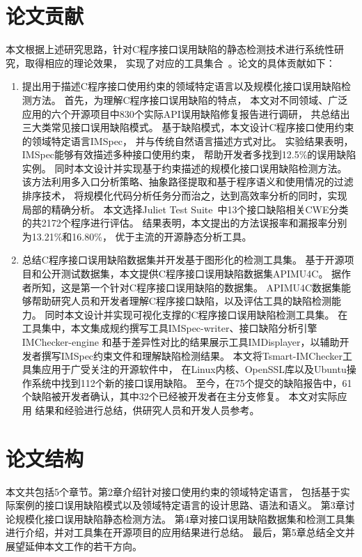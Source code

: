 \section{论文贡献}
本文根据上述研究思路，针对C程序接口误用缺陷的静态检测技术进行系统性研究，取得相应的理论效果，
实现了对应的工具集合~\cite{19-icse-imchecker, 19-tase-imspec, 19-compsac-empirical}。论文的具体贡献如下：

\begin{enumerate}
	\item 提出用于描述C程序接口使用约束的领域特定语言以及规模化接口误用缺陷检测方法。
	首先，为理解C程序接口误用缺陷的特点，
	本文对不同领域、广泛应用的六个开源项目中830个实际API误用缺陷修复报告进行调研，
	共总结出三大类常见接口误用缺陷模式。
	基于缺陷模式，本文设计C程序接口使用约束的领域特定语言IMSpec，
	并与传统自然语言描述方式对比。
	实验结果表明，IMSpec能够有效描述多种接口使用约束，
	帮助开发者多找到12.5\%的误用缺陷实例。
	同时本文设计并实现基于约束描述的规模化接口误用缺陷检测方法。
	该方法利用多入口分析策略、抽象路径提取和基于程序语义和使用情况的过滤排序技术，
	将规模化代码分析任务分而治之，达到高效率分析的同时，实现局部的精确分析。
	本文选择Juliet Test Suite~\cite{juliet}中13个接口缺陷相关CWE分类的共2172个程序进行评估。
	结果表明，本文提出的方法误报率和漏报率分别为13.21\%和16.80\%，
	优于主流的开源静态分析工具。
	
	\item 总结C程序接口误用缺陷数据集并开发基于图形化的检测工具集。
	基于开源项目和公开测试数据集，本文提供C程序接口误用缺陷数据集APIMU4C。
	据作者所知，这是第一个针对C程序接口误用缺陷的数据集。
	APIMU4C数据集能够帮助研究人员和开发者理解C程序接口缺陷，以及评估工具的缺陷检测能力。
	同时本文设计并实现可视化支撑的C程序接口误用缺陷检测工具集。
	在工具集中，本文集成规约撰写工具IMSpec-writer、接口缺陷分析引擎IMChecker-engine
	和基于差异性对比的结果展示工具IMDisplayer，以辅助开发者撰写IMSpec约束文件和理解缺陷检测结果。
	本文将Tsmart-IMChecker工具集应用于广受关注的开源软件中，
	在Linux内核、OpenSSL库以及Ubuntu操作系统中找到112个新的接口误用缺陷。
	至今，在75个提交的缺陷报告中，61个缺陷被开发者确认，其中32个已经被开发者在主分支修复。
	本文对实际应用 结果和经验进行总结，供研究人员和开发人员参考。
	
	
	
\end{enumerate}
\section{论文结构}
本文共包括5个章节。第2章介绍针对接口使用约束的领域特定语言，
包括基于实际案例的接口误用缺陷模式以及领域特定语言的设计思路、语法和语义。
第3章讨论规模化接口误用缺陷静态检测方法。
第4章对接口误用缺陷数据集和检测工具集进行介绍，并对工具集在开源项目的应用结果进行总结。
最后，第5章总结全文并展望延伸本文工作的若干方向。

